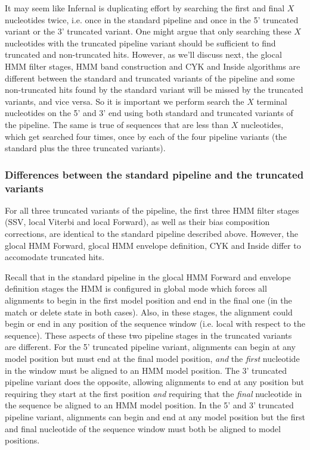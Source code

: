 \begin{sreoutput}
It may seem like Infernal is duplicating effort by searching the first
and final $X$ nucleotides twice, i.e. once in the standard pipeline and
once in the 5' truncated variant or the 3' truncated variant. One
might argue that only searching these $X$ nucleotides with the truncated
pipeline variant should be sufficient to find truncated and
non-truncated hits. However, as we'll discuss next, the glocal HMM
filter stages, HMM band construction and CYK and Inside algorithms are
different between the standard and truncated variants of the pipeline
and some non-truncated hits found by the standard variant will be
missed by the truncated variants, and vice versa. So it is important
we perform search the $X$ terminal nucleotides on the 5' and 3' end
using both standard and truncated variants of the pipeline. The same
is true of sequences that are less than $X$ nucleotides, which get
searched four times, once by each of the four pipeline variants (the
standard plus the three truncated variants).

\subsubsection{Differences between the standard pipeline and the
  truncated variants}

For all three truncated variants of the pipeline, the first three HMM
filter stages (SSV, local Viterbi and local Forward), as well as their
bias composition corrections, are identical to the standard pipeline
described above. However, the glocal HMM Forward, glocal HMM envelope
definition, CYK and Inside differ to accomodate truncated hits.

Recall that in the standard pipeline in the glocal HMM Forward and
envelope definition stages the HMM is configured in global mode which
forces all alignments to begin in the first model position and end in
the final one (in the match or delete state in both cases). Also, in
these stages, the alignment could begin or end in any position of the
sequence window (i.e. local with respect to the sequence).  These
aspects of these two pipeline stages in the truncated variants are
different. For the 5' truncated pipeline variant, alignments can begin
at any model position but must end at the final model position,
\emph{and} the \emph{first} nucleotide in the window must be aligned to an HMM
model position. The 3' truncated pipeline variant does the opposite,
allowing alignments to end at any position but requiring they start at
the first position \emph{and} requiring that the \emph{final} nucleotide
in the sequence be aligned to an HMM model position. 
In the 5' and 3' truncated pipeline variant, alignments can begin and
end at any model position but the first and final nucleotide of the
sequence window must both be aligned to model positions. 


\end{sreoutput}
